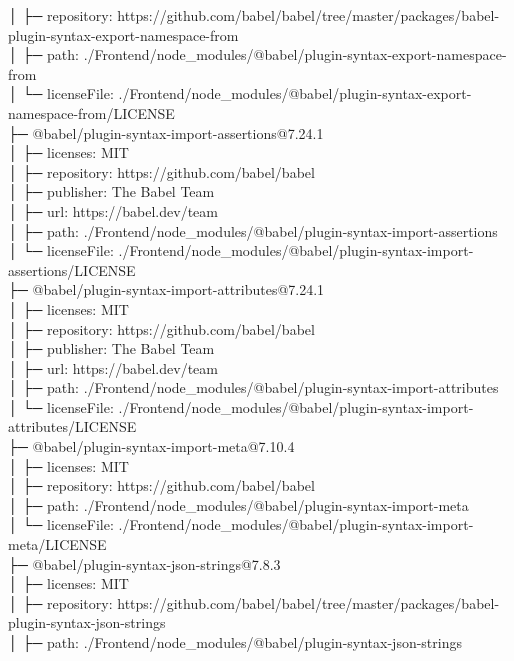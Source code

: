 \documentclass[
    paper=a4,
    twoside=false,
    parskip=half,
    listof=entryprefix,
    listof=totoc,
    index=totoc,
    bibliography=totoc,
    headsepline,
]{scrbook}
\begin{document}
    │  ├─ repository: https://github.com/babel/babel/tree/master/packages/babel-plugin-syntax-export-namespace-from\\
    │  ├─ path: ./Frontend/node\_modules/@babel/plugin-syntax-export-namespace-from\\
    │  └─ licenseFile: ./Frontend/node\_modules/@babel/plugin-syntax-export-namespace-from/LICENSE\\
    ├─ @babel/plugin-syntax-import-assertions@7.24.1\\
    │  ├─ licenses: MIT\\
    │  ├─ repository: https://github.com/babel/babel\\
    │  ├─ publisher: The Babel Team\\
    │  ├─ url: https://babel.dev/team\\
    │  ├─ path: ./Frontend/node\_modules/@babel/plugin-syntax-import-assertions\\
    │  └─ licenseFile: ./Frontend/node\_modules/@babel/plugin-syntax-import-assertions/LICENSE\\
    ├─ @babel/plugin-syntax-import-attributes@7.24.1\\
    │  ├─ licenses: MIT\\
    │  ├─ repository: https://github.com/babel/babel\\
    │  ├─ publisher: The Babel Team\\
    │  ├─ url: https://babel.dev/team\\
    │  ├─ path: ./Frontend/node\_modules/@babel/plugin-syntax-import-attributes\\
    │  └─ licenseFile: ./Frontend/node\_modules/@babel/plugin-syntax-import-attributes/LICENSE\\
    ├─ @babel/plugin-syntax-import-meta@7.10.4\\
    │  ├─ licenses: MIT\\
    │  ├─ repository: https://github.com/babel/babel\\
    │  ├─ path: ./Frontend/node\_modules/@babel/plugin-syntax-import-meta\\
    │  └─ licenseFile: ./Frontend/node\_modules/@babel/plugin-syntax-import-meta/LICENSE\\
    ├─ @babel/plugin-syntax-json-strings@7.8.3\\
    │  ├─ licenses: MIT\\
    │  ├─ repository: https://github.com/babel/babel/tree/master/packages/babel-plugin-syntax-json-strings\\
    │  ├─ path: ./Frontend/node\_modules/@babel/plugin-syntax-json-strings\\
\end{document}
